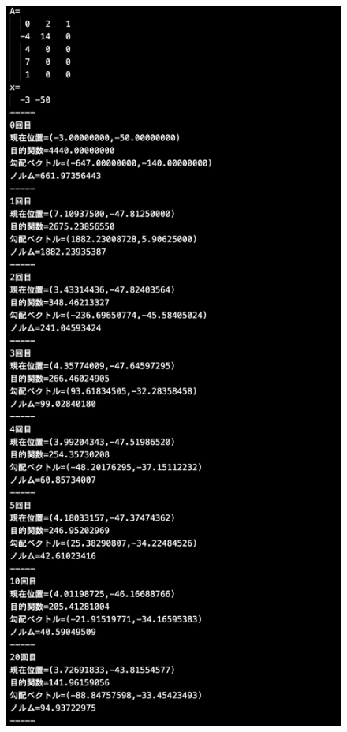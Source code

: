 \documentclass[12pt]{jarticle}
\begin{document}
\clearpage
\begin{figure}[h]
    \begin{center}
        \includegraphics[scale=0.2]{kadai1_2s_out3_2_1.png}
    \end{center}

\end{figure}
\end{document}

